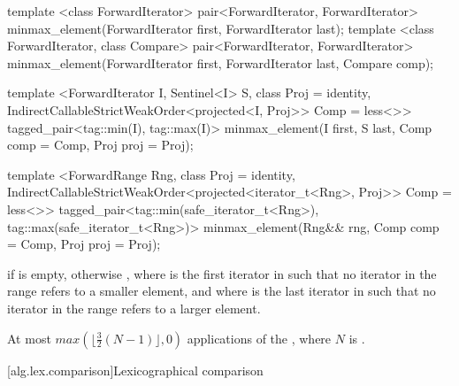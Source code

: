 %
\begin{removedblock}
\begin{itemdecl}
template <class ForwardIterator>
  pair<ForwardIterator, ForwardIterator>
    minmax_element(ForwardIterator first, ForwardIterator last);
template <class ForwardIterator, class Compare>
  pair<ForwardIterator, ForwardIterator>
    minmax_element(ForwardIterator first, ForwardIterator last, Compare comp);
\end{itemdecl}
\end{removedblock}
\begin{addedblock}
\begin{itemdecl}
template <ForwardIterator I, Sentinel<I> S, class Proj = identity,
    IndirectCallableStrictWeakOrder<projected<I, Proj>> Comp = less<>>
  tagged_pair<tag::min(I), tag::max(I)>
    minmax_element(I first, S last, Comp comp = Comp{}, Proj proj = Proj{});

template <ForwardRange Rng, class Proj = identity,
    IndirectCallableStrictWeakOrder<projected<iterator_t<Rng>, Proj>> Comp = less<>>
  tagged_pair<tag::min(safe_iterator_t<Rng>),
              tag::max(safe_iterator_t<Rng>)>
    minmax_element(Rng&& rng, Comp comp = Comp{}, Proj proj = Proj{});
\end{itemdecl}
\end{addedblock}

\begin{itemdescr}
\pnum
\returns
{} if  is empty, otherwise
, where  is
the first iterator in  such that no iterator in the range refers to a smaller
element, and where  is the last iterator in  such that no iterator
in the range refers to a larger element.

\pnum
\complexity
At most
$max(\lfloor{\frac{3}{2}} (N-1)\rfloor, 0)$
applications of the ,
where $N$ is .
\end{itemdescr}

[alg.lex.comparison]{Lexicographical comparison}

